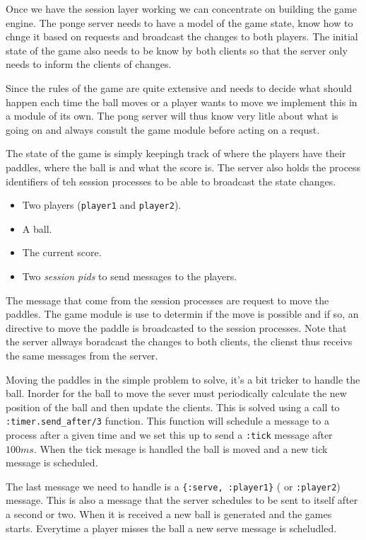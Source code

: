 \documentclass[a4paper,11pt]{article}
\begin{document}
Once we have the session layer working we can concentrate on building
the game engine. The ponge server needs to have a model of the game
state, know how to chnge it based on requests and broadcast the
changes to both players. The initial state of the game also needs to be
know by both clients so that the server only needs to inform the
clients of changes.

Since the rules of the game are quite extensive and needs to decide
what should happen each time the ball moves or a player wants to move
we implement this in a module of its own. The pong server will thus
know very litle about what is going on and always consult the game
module before acting on a requst. 

The state of the game is simply keepingh track of where the players
have their paddles, where the ball is and what the score is. The
server also holds the process identifiers of teh session processes to
be able to broadcast the state changes.


\begin{itemize}
\item Two players ({\tt player1} and {\tt player2}).
\item A ball.
\item The current score.
\item Two {\em session pids} to send messages to the players. 
\end{itemize}

The message that come from the session processes are request to move
the paddles. The game module is use to determin if the move is
possible and if so, an directive to move the paddle is broadcasted to
the session processes. Note that the server allways boradcast the
changes to both clients, the clienst thus receivs the same messages
from the server.

Moving the paddles in the simple problem to solve, it's a bit tricker
to handle the ball. Inorder for the ball to move the sever must
periodically calculate the new position of the ball and then update
the clients. This is solved using a call to {\tt :timer.send_after/3}
function. This function will schedule a message to a process after a
given time and we set this up to send a {\tt :tick} message after
$100 ms$. When the tick mesage is handled the ball is moved and a new
tick message is scheduled.

The last message we need to handle is a {\tt \{:serve, :player1\}} (
or {\tt :player2}) message. This is also a message that the server
schedules to be sent to itself after a second or two. When it is
received a new ball is generated and the games starts. Everytime a
player misses the ball a new serve message is scheludled.
\end{document}

